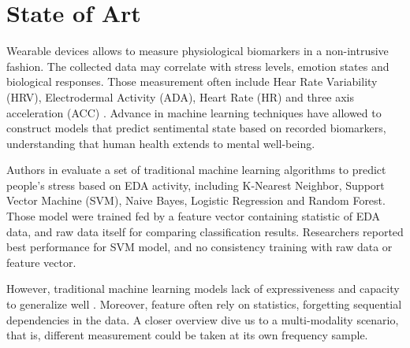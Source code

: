 \section{State of Art}


Wearable devices allows to measure physiological biomarkers in a non-intrusive fashion. The collected data may correlate with stress levels, emotion states and biological responses. Those measurement often include Hear Rate Variability (HRV), Electrodermal Activity (ADA), Heart Rate (HR) and three axis acceleration (ACC) \cite{Vos2023}. Advance in machine learning techniques have allowed to construct models that predict sentimental state based on recorded biomarkers, understanding that human health extends to mental well-being.

Authors in \cite{Zhu2023} evaluate a set of traditional machine learning algorithms to predict people's stress based on EDA activity, including K-Nearest Neighbor, Support Vector Machine (SVM), Naive Bayes, Logistic Regression and Random Forest. Those model were trained fed by a feature vector containing statistic of EDA data, and raw data itself for comparing classification results. Researchers reported best performance for SVM model, and no consistency training with raw data or feature vector.

However, traditional machine learning models lack of expressiveness and capacity to generalize well \cite{Yang2023}. Moreover, feature often rely on statistics, forgetting sequential dependencies in the data. A closer overview dive us to a multi-modality scenario, that is, different measurement could be taken at its own frequency sample.




